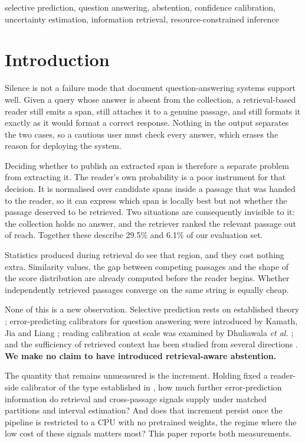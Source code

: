 \documentclass[conference]{IEEEtran}
\begin{document}
\begin{IEEEkeywords}
selective prediction, question answering, abstention, confidence calibration,
uncertainty estimation, information retrieval, resource-constrained inference
\end{IEEEkeywords}

\section{Introduction}
Silence is not a failure mode that document question-answering systems support
well. Given a query whose answer is absent from the collection, a retrieval-based
reader still emits a span, still attaches it to a genuine passage, and still
formats it exactly as it would format a correct response. Nothing in the output
separates the two cases, so a cautious user must check every answer, which erases
the reason for deploying the system.

Deciding whether to publish an extracted span is therefore a separate problem from
extracting it. The reader's own probability is a poor instrument for that decision.
It is normalised over candidate spans inside a passage that was handed to the
reader, so it can express which span is locally best but not whether the passage
deserved to be retrieved. Two situations are consequently invisible to it: the
collection holds no answer, and the retriever ranked the relevant passage out of
reach. Together these describe 29.5\% and 6.1\% of our evaluation set.

Statistics produced during retrieval do see that region, and they cost nothing
extra. Similarity values, the gap between competing passages and the shape of the
score distribution are already computed before the reader begins. Whether
independently retrieved passages converge on the same string is equally cheap.

None of this is a new observation. Selective prediction rests on established
theory \cite{elyaniv2010,geifman2017}; error-predicting calibrators for question
answering were introduced by Kamath, Jia and Liang \cite{kamath2020}; reading
calibration at scale was examined by Dhuliawala \emph{et al.} \cite{dhuliawala2022};
and the sufficiency of retrieved context has been studied from several directions
\cite{joren2025,abdumalikov2024,lewis2021,muhamed2025}. \textbf{We make no claim to
have introduced retrieval-aware abstention.}

The quantity that remains unmeasured is the increment. Holding fixed a reader-side
calibrator of the type established in \cite{kamath2020}, how much further
error-prediction information do retrieval and cross-passage signals supply under
matched partitions and interval estimation? And does that increment persist once
the pipeline is restricted to a CPU with no pretrained weights, the regime where
the low cost of these signals matters most? This paper reports both measurements.
\end{document}
